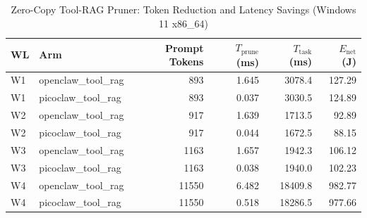 \begin{table}[t]
\centering\small
\caption{Zero-Copy Tool-RAG Pruner: Token Reduction and Latency Savings (Windows 11 x86_64)}
\label{tab:Windows_tool_rag}
\begin{tabular}{llrrrr}
\toprule
WL & Arm & Prompt Tokens & $T_{\text{prune}}$ (ms) & $T_{\text{task}}$ (ms) & $E_{\text{net}}$ (J) \\
\midrule
W1 & openclaw\_tool\_rag & 893 & 1.645 & 3078.4 & 127.29 \\
W1 & picoclaw\_tool\_rag & 893 & 0.037 & 3030.5 & 124.89 \\
W2 & openclaw\_tool\_rag & 917 & 1.639 & 1713.5 & 92.89 \\
W2 & picoclaw\_tool\_rag & 917 & 0.044 & 1672.5 & 88.15 \\
W3 & openclaw\_tool\_rag & 1163 & 1.657 & 1942.3 & 106.12 \\
W3 & picoclaw\_tool\_rag & 1163 & 0.038 & 1940.0 & 102.23 \\
W4 & openclaw\_tool\_rag & 11550 & 6.482 & 18409.8 & 982.77 \\
W4 & picoclaw\_tool\_rag & 11550 & 0.518 & 18286.5 & 977.66 \\
\bottomrule
\end{tabular}
\end{table}
